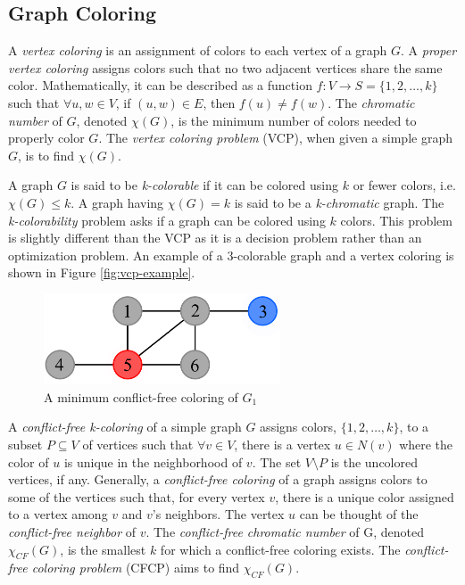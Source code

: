 \documentclass{sig-alternate}
\begin{document}
\subsection{Graph Coloring}
\label{sec:coloring}
A \emph{vertex coloring} is an assignment of colors to each vertex of a graph $G$. A \emph{proper vertex coloring} assigns colors such that no two adjacent vertices share the same color. Mathematically, it can be described as a function $f : V \rightarrow S = \{1, 2, \dots, k\}$ such that $\forall u,w \in V$, if $(u,w) \in E$, then $f(u) \neq f(w)$. The \emph{chromatic number} of $G$, denoted $\chi(G)$, is the minimum number of colors needed to properly color $G$. The \emph{vertex coloring problem} (VCP), when given a simple graph $G$, is to find $\chi(G)$. \cite{bondy1976graph}

A graph $G$ is said to be \emph{k-colorable} if it can be colored using $k$ or fewer colors, i.e. $\chi(G) \leq k$. A graph having $\chi(G) = k$ is said to be a \emph{k-chromatic} graph. The \emph{k-colorability} problem asks if a graph can be colored using $k$ colors. This problem is slightly different than the VCP as it is a decision problem rather than an optimization problem. An example of a 3-colorable graph and a vertex coloring is shown in Figure \ref{fig:vcp-example}.

\begin{figure}[h]
	\centering
	\includegraphics[width=7cm]{../figures/example-cfcp.pdf}
	\caption{A minimum conflict-free coloring of $G_1$}\label{fig:cfcp-example}
\end{figure}

A \emph{conflict-free k-coloring} of a simple graph $G$ assigns colors, $\{1, 2, \ldots, k\}$, to a subset $P \subseteq V$ of vertices such that $\forall v \in V$, there is a vertex $u \in N(v)$ where the color of $u$ is unique in the neighborhood of $v$. The set $V \setminus P$ is the uncolored vertices, if any. Generally, a \emph{conflict-free coloring} of a graph assigns colors to some of the vertices such that, for every vertex $v$, there is a unique color assigned to a vertex among $v$ and $v$'s neighbors. The vertex $u$ can be thought of the \emph{conflict-free neighbor} of $v$. The \emph{conflict-free chromatic number} of G, denoted $\chi_{CF}(G)$, is the smallest $k$ for which a conflict-free coloring exists. The \emph{conflict-free coloring problem} (CFCP) aims to find $\chi_{CF}(G)$. \cite{abel2017three}
\end{document}
